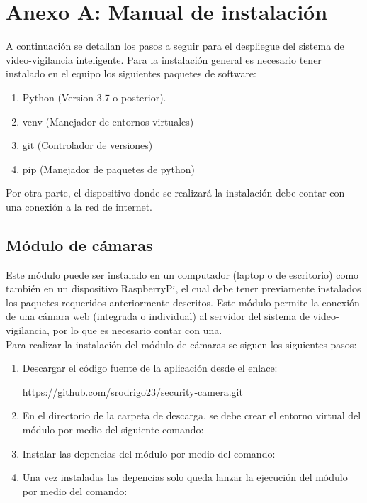 \chapter{Anexo A: Manual de instalación}

A continuación se detallan los pasos a seguir para el despliegue del sistema de video-vigilancia inteligente. Para la instalación general es necesario tener instalado en el equipo los siguientes paquetes de software:

\begin{enumerate}
    \item Python (Version 3.7 o posterior).
    \item venv (Manejador de entornos virtuales)
    \item git (Controlador de versiones)
    \item pip (Manejador de paquetes de python) 
\end{enumerate}

Por otra parte, el dispositivo donde se realizará la instalación debe contar con una conexión a la red de internet.

\section*{Módulo de cámaras}
Este módulo puede ser instalado en un computador (laptop o de escritorio) como también en un dispositivo RaspberryPi, el cual debe tener previamente instalados los paquetes requeridos anteriormente descritos. Este módulo permite la conexión de una cámara web (integrada o individual) al servidor del sistema de video-vigilancia, por lo que es necesario contar con una.\\

Para realizar la instalación del módulo de cámaras se siguen los siguientes pasos:

\begin{enumerate}
    \item Descargar el código fuente de la aplicación desde el enlace: \begin{center}
        \url{https://github.com/srodrigo23/security-camera.git}
    \end{center}
    \item En el directorio de la carpeta de descarga, se debe crear el entorno virtual del módulo por medio del siguiente comando: 
    \begin{center}
    \end{center}
    \item Instalar las depencias del módulo por medio del comando:
    \begin{center}
    \end{center} 
    \item Una vez instaladas las depencias solo queda lanzar la ejecución del módulo por medio del comando:\begin{center}
    \end{center}
\end{enumerate}

